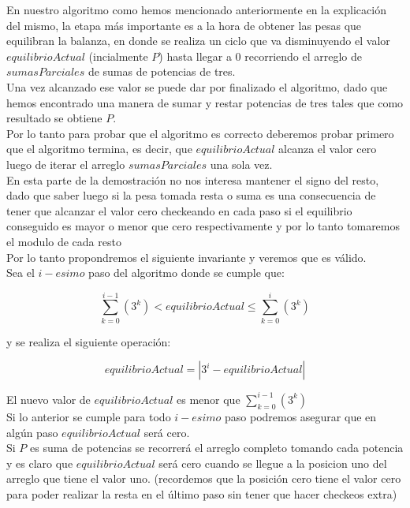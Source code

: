 En nuestro algoritmo como hemos mencionado anteriormente en la explicaci\'on del mismo, la etapa m\'as importante es a la hora de obtener las pesas que equilibran la balanza, en donde se realiza un ciclo que va disminuyendo el valor $equilibrioActual$ (incialmente $P$) hasta llegar a 0 recorriendo el arreglo de $sumasParciales$ de sumas de potencias de tres.\\
Una vez alcanzado ese valor se puede dar por finalizado el algoritmo, dado que hemos encontrado una manera de sumar y restar potencias de tres tales que como resultado se obtiene $P$.\\

Por lo tanto para probar que el algoritmo es correcto deberemos probar primero que el algoritmo termina, es decir, que $equilibrioActual$ alcanza el valor cero luego de iterar el arreglo $sumasParciales$ una sola vez.\\

En esta parte de la demostración no nos interesa mantener el signo del resto, dado que saber luego si la pesa tomada resta o suma es una consecuencia de tener que alcanzar el valor cero checkeando en cada paso si el equilibrio conseguido es mayor o menor que cero respectivamente y por lo tanto tomaremos el modulo de cada resto\\

Por lo tanto propondremos el siguiente invariante y veremos que es válido.\\

Sea el $i-esimo$ paso del algoritmo donde se cumple que:

\begin{equation}
\sum_{k=0}^{i-1}(3^k) < equilibrioActual \leq  \sum_{k=0}^{i}(3^k) 
\end{equation}

y se realiza el siguiente operación:

\begin{equation}
equilibrioActual = | 3^i - equilibrioActual |
\end{equation} 

El nuevo valor de $equilibrioActual$ es menor que $\sum_{k=0}^{i-1}(3^k)$\\

Si lo anterior se cumple para todo $i-esimo$ paso podremos asegurar que en algún paso $equilibrioActual$ será cero.\\

Si $P$ es suma de potencias se recorrerá el arreglo completo tomando cada potencia y es claro que $equilibrioActual$ será cero cuando se llegue a la posicion uno del arreglo que tiene el valor uno. (recordemos que la posición cero tiene el valor cero para poder realizar la resta en el último paso sin tener que hacer checkeos extra) \\

